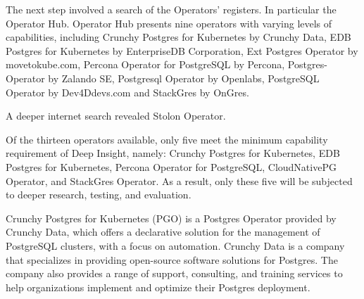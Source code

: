 The next step involved a search of the Operators' registers. In particular the Operator Hub. \cite{OperatorHubPGSearch} Operator Hub presents nine operators with varying levels of capabilities, including Crunchy Postgres for Kubernetes by Crunchy Data, EDB Postgres for Kubernetes by EnterpriseDB Corporation, Ext Postgres Operator by movetokube.com, Percona Operator for PostgreSQL by Percona, Postgres-Operator by Zalando SE, Postgresql Operator by Openlabs, PostgreSQL Operator by Dev4Ddevs.com and StackGres by OnGres.

A deeper internet search revealed Stolon Operator. \cite{PalarkComparingKubernetes}

Of the thirteen operators available, only five meet the minimum capability requirement of Deep Insight, namely: Crunchy Postgres for Kubernetes, EDB Postgres for Kubernetes, Percona Operator for PostgreSQL, CloudNativePG Operator, and StackGres Operator. As a result, only these five will be subjected to deeper research, testing, and evaluation.

\pagebreak
{}
Crunchy Postgres for Kubernetes (PGO) is a Postgres Operator provided by Crunchy Data, which offers a declarative solution for the management of PostgreSQL clusters, with a focus on automation.
Crunchy Data is a company that specializes in providing open-source software solutions for Postgres. The company also provides a range of support, consulting, and training services to help organizations implement and optimize their Postgres deployment. \cite{Crunchy}

